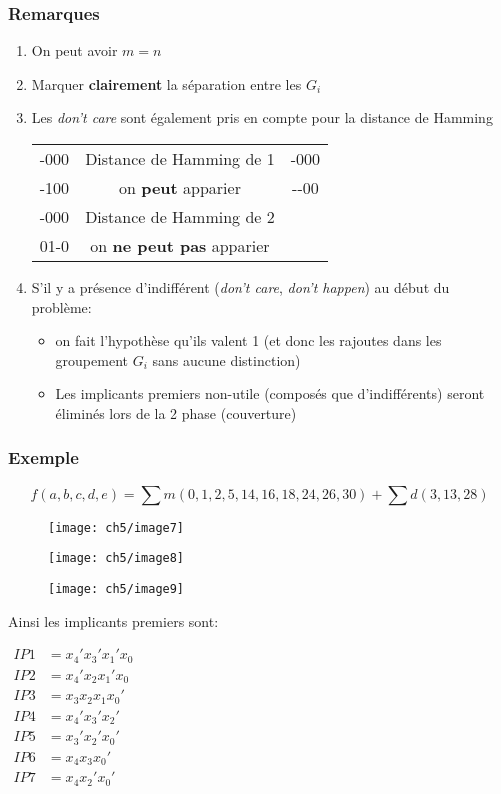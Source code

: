 \subsubsection{Remarques}
\begin{enumerate}
	\item On peut avoir $m=n$
	\item Marquer \textbf{clairement} la séparation entre les $G_i$
	\item Les \textit{don't care} sont également pris en compte pour la distance de Hamming
	\begin{table}[H]
		\centering
		\begin{tabular}{|ccc|}
			\hline
			-000 & Distance de Hamming de 1 & -000\\
			-100 & on \textbf{peut} apparier & -{}-00\\
			\hline
			-000 & Distance de Hamming de 2 & \\
			01-0 & on \textbf{ne peut pas} apparier & \\
			\hline
		\end{tabular}
	\end{table}
	\item S'il y a présence d'indifférent (\textit{don't care}, \textit{don't happen}) au début du problème:
	\begin{itemize}
		\item on fait l'hypothèse qu'ils valent 1 (et donc les rajoutes dans les groupement $G_i$ sans aucune distinction)
		\item Les implicants premiers non-utile (composés que d'indifférents) seront éliminés lors de la 2 phase (couverture)
	\end{itemize}
\end{enumerate}
\subsubsection{Exemple}
\begin{equation*}
	f(a,b,c,d,e)=\sum m(0,1,2,5,14,16,18,24,26,30)+\sum d(3,13,28)
\end{equation*}
\begin{figure}[H]
	\centering
	\texttt{[image: ch5/image7]}
\end{figure}
\begin{figure}[H]
	\centering
	\texttt{[image: ch5/image8]}
\end{figure}
\begin{figure}[H]
	\centering
	\texttt{[image: ch5/image9]}
\end{figure}
Ainsi les implicants premiers sont:
\begin{table}[H]
	\centering
	$\begin{array}{ll}
	IP1 & =x_4'x_3'x_1'x_0 \\
	IP2 & =x_4'x_2x_1'x_0\\
	IP3 & =x_3x_2x_1x_0'\\
	IP4 & =x_4'x_3'x_2'\\
	IP5 & =x_3'x_2'x_0'\\
	IP6 & =x_4x_3x_0'\\
	IP7 & =x_4x_2'x_0'\\
	\end{array}$
\end{table}
